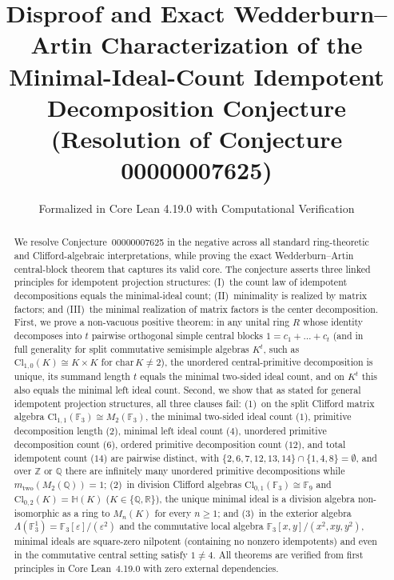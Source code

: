 \documentclass[11pt]{article}
\title{\textbf{Disproof and Exact Wedderburn--Artin Characterization of the\\
Minimal-Ideal-Count Idempotent Decomposition Conjecture}\\
\large (Resolution of Conjecture 00000007625)}
\author{Formalized in Core Lean 4.19.0 with Computational Verification}
\date{}
\theoremstyle{definition}
\newcommand{\Cl}{\mathrm{Cl}}
\newcommand{\Mat}{M}
\newcommand{\F}{\mathbb{F}}
\newcommand{\Z}{\mathbb{Z}}
\newcommand{\Q}{\mathbb{Q}}
\newcommand{\R}{\mathbb{R}}
\newcommand{\HH}{\mathbb{H}}
\begin{document}
\maketitle

\begin{abstract}
We resolve Conjecture~00000007625 in the negative across all standard
ring-theoretic and Clifford-algebraic interpretations, while proving the exact
Wedderburn--Artin central-block theorem that captures its valid core. The
conjecture asserts three linked principles for idempotent projection structures:
(I)~the count law of idempotent decompositions equals the minimal-ideal count;
(II)~minimality is realized by matrix factors; and (III)~the minimal realization
of matrix factors is the center decomposition. First, we prove a non-vacuous
positive theorem: in any unital ring $R$ whose identity decomposes into $t$
pairwise orthogonal simple central blocks $1 = c_1 + \dots + c_t$ (and in full
generality for split commutative semisimple algebras $K^t$, such as
$\Cl_{1,0}(K) \cong K \times K$ for $\mathrm{char}\,K \neq 2$), the unordered
central-primitive decomposition is unique, its summand length $t$ equals the
minimal two-sided ideal count, and on $K^t$ this also equals the minimal left
ideal count. Second, we show that as stated for general idempotent projection
structures, all three clauses fail:
(1)~on the split Clifford matrix algebra $\Cl_{1,1}(\F_3) \cong \Mat_2(\F_3)$,
the minimal two-sided ideal count ($1$), primitive decomposition length ($2$),
minimal left ideal count ($4$), unordered primitive decomposition count ($6$),
ordered primitive decomposition count ($12$), and total idempotent count ($14$)
are pairwise distinct, with $\{2,6,7,12,13,14\} \cap \{1,4,8\} = \emptyset$,
and over $\Z$ or $\Q$ there are infinitely many unordered primitive
decompositions while $m_{\mathrm{two}}(\Mat_2(\Q)) = 1$;
(2)~in division Clifford algebras $\Cl_{0,1}(\F_3) \cong \F_9$ and
$\Cl_{0,2}(K) = \HH(K)$ ($K \in \{\Q, \R\}$), the unique minimal ideal is a
division algebra non-isomorphic as a ring to $\Mat_n(K)$ for every $n \ge 1$;
and (3)~in the exterior algebra $\Lambda(\F_3^1) = \F_3[\varepsilon]/(\varepsilon^2)$
and the commutative local algebra $\F_3[x,y]/(x^2,xy,y^2)$, minimal ideals are
square-zero nilpotent (containing no nonzero idempotents) and even in the
commutative central setting satisfy $1 \neq 4$. All theorems are verified from
first principles in Core Lean~4.19.0 with zero external dependencies.
\end{abstract}
\end{document}
